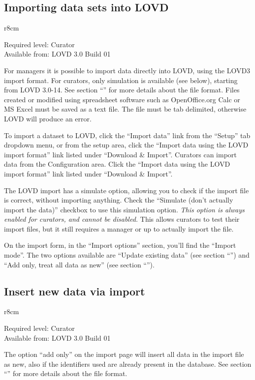 \subsection{Importing data sets into LOVD}
\begin{wrapfigure}[3]{r}{8cm} %
  \vspace{-25pt}
  \begin{leftbar}
    Required level: Curator\\
    Available from: LOVD 3.0 Build 01
  \end{leftbar}
\end{wrapfigure}
For managers it is possible to import data directly into LOVD, using the LOVD3 import format.
For curators, only simulation is available (see below), starting from LOVD 3.0-14.
See section ``'' for more details about the file format.
Files created or modified using spreadsheet software such as OpenOffice.org Calc or MS Excel must be saved as
 a text file.
The file must be tab delimited, otherwise LOVD will produce an error.

To import a dataset to LOVD, click the ``Import data'' link from the ``Setup'' tab dropdown menu,
 or from the setup area, click the ``Import data using the LOVD import format'' link listed under
 ``Download \& Import''.
Curators can import data from the Configuration area.
Click the ``Import data using the LOVD import format'' link listed under ``Download \& Import''.

The LOVD import has a simulate option, allowing you to check if the import file is correct, without importing anything.
Check the ``Simulate (don't actually import the data)'' checkbox to use this simulation option.
\emph{This option is always enabled for curators, and cannot be disabled.}
This allows curators to test their import files,
 but it still requires a manager or up to actually import the file.

On the import form, in the ``Import options'' section, you'll find the ``Import mode''.
The two options available are ``Update existing data'' (see section ``{}'') and
 ``Add only, treat all data as new'' (see section ``{}'').



\subsection{Insert new data via import}
\label{ssec:import_new_data}
\begin{wrapfigure}[3]{r}{8cm} %
  \vspace{-25pt}
  \begin{leftbar}
    Required level: Curator\\
    Available from: LOVD 3.0 Build 01
  \end{leftbar}
\end{wrapfigure}
The option ``add only'' on the import page will insert all data in the import file as new,
 also if the identifiers used are already present in the database.
See section ``'' for more details about the file format.




